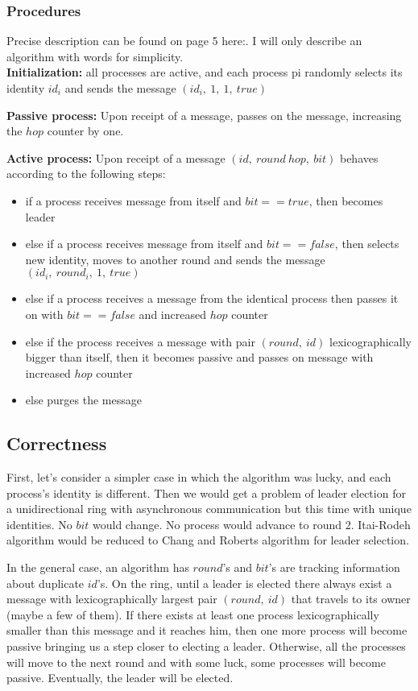 \documentclass{article}
\begin{document}
\subsubsection*{Procedures}
Precise description can be found on page 5 here:\cite{fokkink2005simplifying}. I will only describe an algorithm with words for simplicity. \\

\textbf{Initialization:} all processes are active, and each process pi randomly selects its identity $id_i$ and sends the message $(id_i,\ 1,\ 1,\ true)$

\textbf{Passive process:} Upon receipt of a message, passes on the message, increasing the $hop$ counter by one.

\textbf{Active process:} Upon receipt of a message $(id,\ round\ hop,\ bit)$ behaves according to the following steps:
\begin{itemize}
    \item if a process receives message from itself and $bit == true$, then becomes leader
    \item else if a process receives message from itself and $bit == false$, then selects new identity, moves to another round and sends the message $(id_i,\ round_i,\ 1,\ true)$
    \item else if a process receives a message from the identical process then passes it on with $bit == false$ and increased $hop$ counter
    \item else if the process receives a message with pair $(round,\ id)$ lexicographically bigger than itself, then it becomes passive and passes on message with increased $hop$ counter
    \item else purges the message
\end{itemize}

\clearpage

\subsection*{Correctness}
First, let's consider a simpler case in which the algorithm was lucky, and each process's identity is different. Then we would get a problem of leader election for a unidirectional ring with asynchronous communication but this time with unique identities. No $bit$ would change. No process would advance to round 2. Itai-Rodeh algorithm would be reduced to Chang and Roberts algorithm for leader selection.

In the general case, an algorithm has $round$'s and $bit$'s are tracking information about duplicate $id$'s.  On the ring, until a leader is elected there always exist a message with lexicographically largest pair $(round,\ id)$ that travels to its owner (maybe a few of them). If there exists at least one process lexicographically smaller than this message and it reaches him, then one more process will become passive bringing us a step closer to electing a leader. Otherwise, all the processes will move to the next round and with some luck, some processes will become passive. Eventually, the leader will be elected. 
\end{document}
